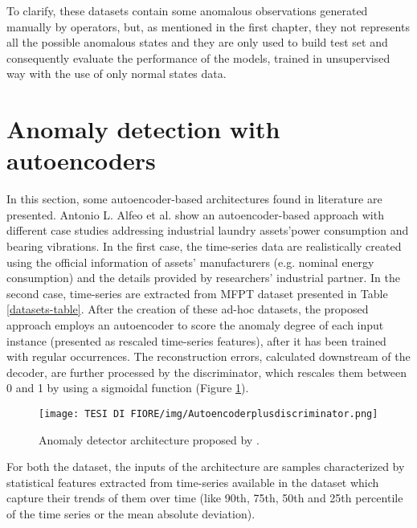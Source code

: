 To clarify, these datasets contain some anomalous observations generated manually by operators, but, as mentioned in the first chapter, they not represents all the possible anomalous states and they are only used to build test set and consequently evaluate the performance of the models, trained in unsupervised way with the use of only normal states data. 

\section{Anomaly detection with autoencoders}
In this section, some autoencoder-based architectures found in literature are presented.
Antonio L. Alfeo et al. \cite{12UsingAEinManufacturing} show an autoencoder-based approach with different case studies addressing industrial laundry assets’power consumption and bearing vibrations. In the first case, the time-series data are realistically created using the official information of assets’ manufacturers (e.g. nominal energy consumption) and the details provided by researchers' industrial partner. In the second case, time-series are extracted from MFPT dataset presented in Table \ref{datasets-table}. After the creation of these ad-hoc datasets, the proposed approach employs an autoencoder to score the anomaly degree of each input instance (presented as rescaled time-series features), after it has been trained with regular occurrences. The reconstruction errors, calculated downstream of the decoder, are further processed by the discriminator, which rescales them between 0 and 1 by using a sigmoidal function (Figure \ref{autoencoder_plus_discriminator}).
\begin{figure}[ht]
\texttt{[image: TESI DI FIORE/img/Autoencoderplusdiscriminator.png]}
\centering
\caption{Anomaly detector architecture proposed by \cite{12UsingAEinManufacturing}.}
\label{autoencoder_plus_discriminator}
\end{figure}
For both the dataset, the inputs of the architecture are samples characterized by statistical features extracted from time-series available in the dataset which capture their trends of them over time (like 90th, 75th, 50th and 25th percentile of the time series or the mean absolute deviation).\\
